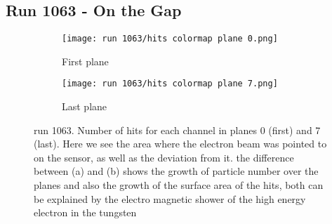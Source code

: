 \documentclass[11pt]{article}
\begin{document}
\newpage
\subsection{Run 1063 - On the Gap}









\begin{figure}[h!]
    \centering
    \begin{subfigure}{0.49\textwidth}
        \texttt{[image: run 1063/hits colormap plane 0.png]}
        \caption{First plane}
    \end{subfigure}
    \hfill
    \begin{subfigure}{0.49\textwidth}
        \texttt{[image: run 1063/hits colormap plane 7.png]}
        \caption{Last plane}
    \end{subfigure}
    \caption{run 1063. Number of hits for each channel in planes 0 (first) and 7 (last). Here we see the area where the electron beam was pointed to on the sensor, as well as the deviation from it. the difference between (a) and (b) shows the growth of particle number over the planes and also the growth of the surface area of the hits, both can be explained by the electro magnetic shower of the high energy electron in the tungsten}
    \label{hit amount colormap}
\end{figure}
\end{document}
